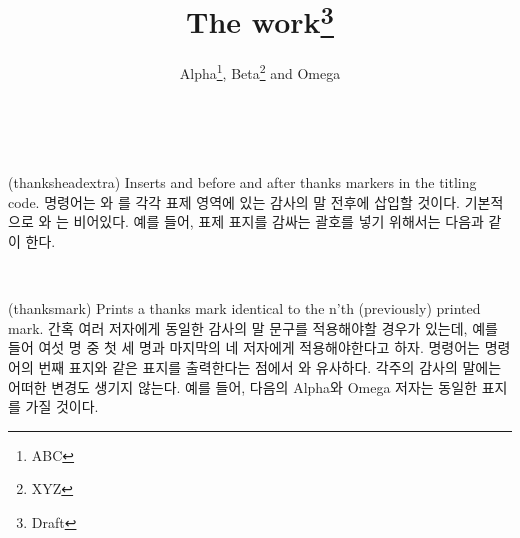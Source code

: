 \begin{syntax}
\cmd{\thanksheadextra} \\
\end{syntax}
\glossary(thanksheadextra)%
  {}%
  {Inserts  and  before and after thanks markers
   in the titling code.}
\cmd{\thanksheadextra} 명령어는 와 를 각각 표제 영역에
있는 감사의 말 전후에 삽입할 것이다.
기본적으로 와 는 비어있다.
예를 들어, 표제 표지를 감싸는 괄호를 넣기 위해서는 다음과 같이 한다.
\begin{lcode}
\thanksheadextra{(}{)}
\end{lcode}


\begin{syntax}
\cmd{\thanksmark} \\
\end{syntax}
\glossary(thanksmark)%
  {}%
  {Prints a thanks mark identical to the n'th (previously) printed mark.}
간혹 여러 저자에게 동일한 감사의 말 문구를 적용해야할 경우가 있는데, 예를 들어
여섯 명 중 첫 세 명과 마지막의 네 저자에게 적용해야한다고 하자.
\cmd{\thanksmark} 명령어는 \cmd{\thanks} 명령어의 번째 표지와
같은 표지를 출력한다는 점에서 \cmd{\footnotemark}와 유사하다.
각주의 감사의 말에는 어떠한 변경도 생기지 않는다.
예를 들어, 다음의 Alpha와 Omega 저자는 동일한 표지를 가질 것이다.
\begin{lcode}
\title{The work\thanks{Draft}}
\author{Alpha\thanks{ABC},
        Beta\thanks{XYZ} and 
        Omega} 
\maketitle
\end{lcode}

